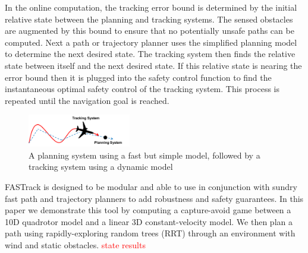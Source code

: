 In the online computation, the tracking error bound is determined by the initial relative state between the planning and tracking systems. The sensed obstacles are augmented by this bound to ensure that no potentially unsafe paths can be computed. Next a path or trajectory planner uses the simplified planning model to determine the next desired state. The tracking system then finds the relative state between itself and the next desired state. If this relative state is nearing the error bound then it is plugged into the safety control function to find the instantaneous optimal safety control of the tracking system. This process is repeated until the navigation goal is reached. 
  

\begin{figure}
	\centering
	\includegraphics[width=0.4\textwidth]{fig/chasing}
	\caption{A planning system using a fast but simple model, followed by a tracking system using a dynamic model}
	\label{fig:chasing}
	\vspace{-.2in}
\end{figure}
%
FASTrack is designed to be modular and able to use in conjunction with sundry fast path and trajectory planners to add robustness and safety guarantees. In this paper we demonstrate this tool by computing a capture-avoid game between a 10D quadrotor model and a linear 3D constant-velocity model. We then plan a path using rapidly-exploring random trees (RRT) through an environment with wind and static obstacles. \textcolor{red}{state results}